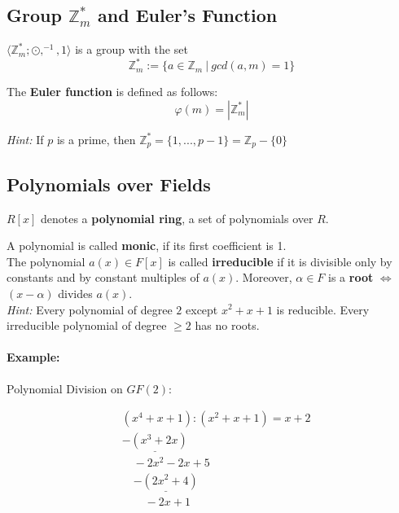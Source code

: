 \documentclass[11pt]{article}
\begin{document}
\subsection{Group $\mathbb{Z}_m^*$ and Euler's Function}

$\langle \mathbb{Z}_m^*; \odot, ^{-1}, 1\rangle$ is a group with the set
\begin{equation*}
	\mathbb{Z}_m^* := \{a \in \mathbb{Z}_m\ |\ gcd(a,m) = 1\}
\end{equation*}

The \textbf{Euler function} is defined as follows:
\begin{equation*}
	\varphi(m) = |\mathbb{Z}_m^*|
\end{equation*}

\emph{Hint:} If $p$ is a prime, then $\mathbb{Z}_p^* = \{1,...,p-1\} = \mathbb{Z}_p - \{0\}$

\subsection{Polynomials over Fields}

$R[x]$ denotes a \textbf{polynomial ring}, a set of polynomials over $R$.

A polynomial is called \textbf{monic}, if its first coefficient is 1. \\
The polynomial $a(x) \in F[x]$ is called \textbf{irreducible} if it is divisible only by constants and by constant multiples of $a(x)$.
Moreover, $\alpha \in F$ is a \textbf{root} $\Leftrightarrow$ $(x-\alpha)$ divides $a(x)$. \\

\emph{Hint:} Every polynomial of degree $2$ except $x^2 + x + 1$ is reducible. Every irreducible polynomial of degree $\geq 2$  has no roots.

\paragraph{Example:} Polynomial Division on $GF(2)$:

\begin{equation*}
\begin{split}
	& (x^4+x+1) : (x^2+x+1) = x + 2 \\
	&\underline{-(x^3+2x)} \\
	& \quad -2x^2 -2x + 5 \\
	& \quad \underline{-(2x^2 + 4)} \\
	&\qquad -2x +1
\end{split}
\end{equation*}
\end{document}
